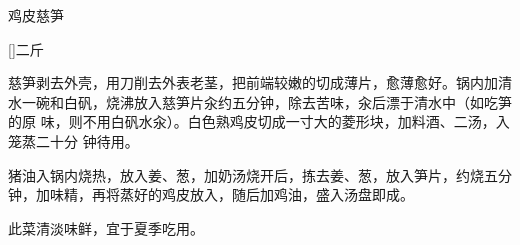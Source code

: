 %
%
%
%
%
%
%
\begin{recipe}{鸡皮慈笋}

\ingredients

[\footnotemark]{二斤}

\preparation

\step 慈笋剥去外壳，用刀削去外表老茎，把前端较嫩的切成薄片，愈薄愈好。锅内加清
水一碗和白矾，烧沸放入慈笋片汆约五分钟，除去苦味，汆后漂于清水中（如吃笋的原
味，则不用白矾水汆）。白色熟鸡皮切成一寸大的菱形块，加料酒、二汤，入笼蒸二十分
钟待用。

\step 猪油入锅内烧热，放入姜、葱，加奶汤烧开后，拣去姜、葱，放入笋片，约烧五分
钟，加味精，再将蒸好的鸡皮放入，随后加鸡油，盛入汤盘即成。

\features

此菜清淡味鲜，宜于夏季吃用。


\end{recipe}

